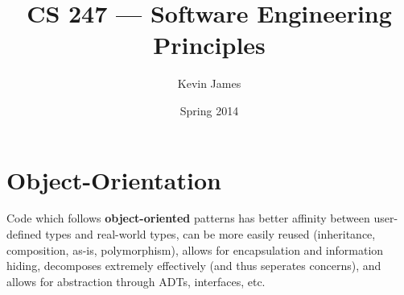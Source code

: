 \documentclass[12pt]{article}
\begin{document}
\title{CS 247 --- Software Engineering Principles}
\author{Kevin James}
\date{\vspace{-2ex}Spring 2014}
\maketitle\HRule

\section{Object-Orientation}
Code which follows {\bf object-oriented} patterns has better affinity between user-defined types and real-world types, can be more easily reused (inheritance, composition, as-is, polymorphism), allows for encapsulation and information hiding, decomposes extremely effectively (and thus seperates concerns), and allows for abstraction through ADTs, interfaces, etc.
\end{document}
